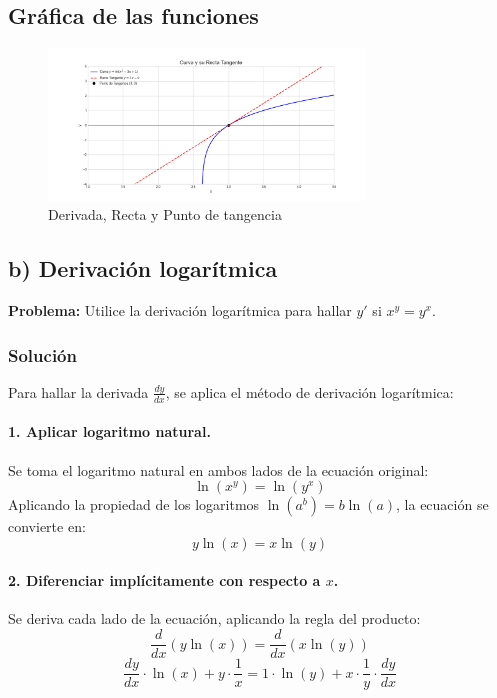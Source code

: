 \documentclass[12pt, letterpaper]{article}
\begin{document}
\subsection*{Gráfica de las funciones}
\begin{figure}[h]
    \centering
    \includegraphics[width=0.75\textwidth]{Figure_2.png}
    \caption{Derivada, Recta y Punto de tangencia}
    \label{fig:Figure_2}
\end{figure}




\hrulefill
\subsection*{b) Derivación logarítmica}
\textbf{Problema:} Utilice la derivación logarítmica para hallar $y'$ si $x^y = y^x$.

\subsubsection*{Solución}
Para hallar la derivada $\frac{dy}{dx}$, se aplica el método de derivación logarítmica:

\paragraph{1. Aplicar logaritmo natural.}
Se toma el logaritmo natural en ambos lados de la ecuación original:
$$
\ln(x^y) = \ln(y^x)
$$
Aplicando la propiedad de los logaritmos $\ln(a^b) = b\ln(a)$, la ecuación se convierte en:
$$
y \ln(x) = x \ln(y)
$$

\paragraph{2. Diferenciar implícitamente con respecto a $x$.}
Se deriva cada lado de la ecuación, aplicando la regla del producto:
$$
\frac{d}{dx}(y \ln(x)) = \frac{d}{dx}(x \ln(y))
$$
$$
\frac{dy}{dx} \cdot \ln(x) + y \cdot \frac{1}{x} = 1 \cdot \ln(y) + x \cdot \frac{1}{y} \cdot \frac{dy}{dx}
$$
\end{document}
